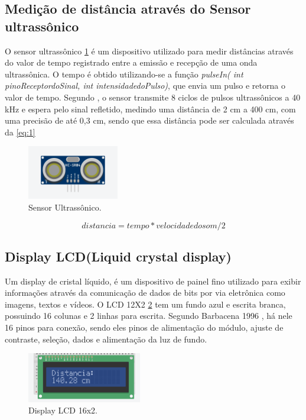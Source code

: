 \documentclass[conference]{IEEEtran}
\begin{document}
\subsection{Medição de distância através do Sensor ultrassônico}

O sensor ultrassônico \ref{fig:ultrassonico} é um dispositivo utilizado para medir distâncias através do valor de tempo registrado entre a emissão e recepção de uma 
onda ultrassônica. O tempo é obtido utilizando-se a função \textit{pulseIn( int pinoReceptordoSinal, int intensidadedoPulso)}, que envia um pulso e retorna o valor de 
tempo. Segundo \cite{nakatani2014}, o sensor transmite 8 ciclos de pulsos ultrassônicos a 40 kHz e espera pelo sinal refletido, medindo uma distância de 2 cm a 400 cm,
com uma precisão de até 0,3 cm, sendo que essa distância pode ser calculada através da \ref{eq:1}

\begin{figure}[htbp]
    \centerline{
        \includegraphics[width=4cm]{images/sensor-ultrassonico.png}
    }
    \caption{Sensor Ultrassônico.}
    \label{fig:ultrassonico}
\end{figure}


\begin{equation}
    distancia = tempo * velocidade do som / 2 \label{eq:1}
\end{equation}

\subsection{Display LCD(Liquid crystal display)}
Um display de cristal líquido, é um dispositivo de painel fino utilizado para exibir informações através da comunicação de dados de bits por via eletrônica como 
imagens, textos e vídeos. O LCD 12X2 \ref{fig:display} tem um fundo azul e escrita branca, possuindo 16 colunas e 2 linhas para escrita. Segundo Barbacena 1996 
\cite{barbacena1996display}, há nele 16 pinos para conexão, sendo eles pinos de alimentação do módulo, ajuste de contraste, seleção, dados e alimentação da luz de fundo.

\begin{figure}[htbp]
    \centerline{
        \includegraphics[width=5cm]{images/display.png}
    }
    \caption{Display LCD 16x2.}
    \label{fig:display}
\end{figure}
\end{document}
